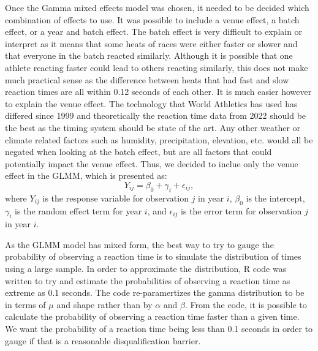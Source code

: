 \documentclass[12pt, letterpaper, titlepage]{article}
\begin{document}
Once the Gamma mixed effects model was chosen, it needed to be decided which combination
of effects to use.  It was possible to include a venue effect, a batch effect, 
or a year and batch effect.  The batch effect is very
difficult to explain or interpret as it means that some heats of races were either
faster or slower and that everyone in the batch reacted similarly.  Although
it is possible that one athlete reacting faster could lead to others reacting
similarly, this does not make much practical sense as the difference between
heats that had fast and slow reaction times are all within 0.12 seconds of each
other.  It is much easier however to explain the venue effect.  The technology
that World Athletics has used has differed since 1999 and theoretically the
reaction time data from 2022 should be the best as the timing system should be
state of the art.  Any other weather or climate related factors such as humidity,
precipitation, elevation, etc. would all be negated when looking at the batch
effect, but are all factors that could potentially impact the venue effect.
Thus, we decided to inclue only the venue effect in the GLMM, which is presented
as:
\begin{equation}
  \label{eq:GLMM}
  Y_{ij} = \beta_0 + \gamma_i + \epsilon_{ij},
\end{equation}
where $Y_{ij}$ is the response variable for observation $j$ in year $i$, 
$\beta_0$ is the intercept, $\gamma_i$ is the random effect term for year $i$, 
and $\epsilon_{ij}$ is the error term for observation $j$ in year $i$.


As the GLMM model has mixed form, the best way to try to gauge the probability
of observing a reaction time is to simulate the distribution of times using a 
large sample.  In order to approximate the distribution, R code was written to 
try and estimate the probabilities of observing a reaction time as extreme as
0.1 seconds.  The code re-paramertizes the gamma distribution to be in terms of
$\mu$ and shape rather than by $\alpha$ and $\beta$.  From the code, it is
possible to calculate the probability of observing a reaction time faster than
a given time.  We want the probability of a reaction time being less than 0.1
seconds in order to gauge if that is a reasonable disqualification barrier.
\end{document}
